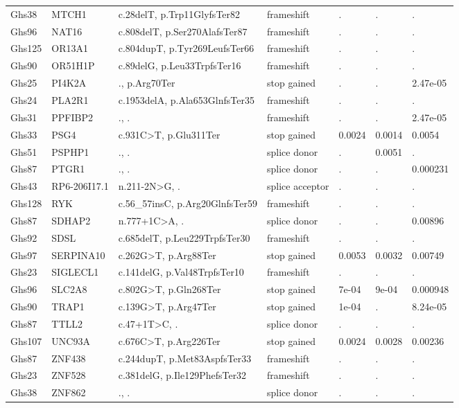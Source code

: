 \documentclass[12pt,twoside]{reedthesis}
\theoremstyle{definition}
\theoremstyle{definition}
\theoremstyle{remark}
\begin{document}
\begin{landscape}
\begin{longtable}[t]{lllllll}
  Ghs38 & MTCH1 & c.28delT, p.Trp11GlyfsTer82 & frameshift & . & . & .\\
  Ghs96 & NAT16 & c.808delT, p.Ser270AlafsTer87 & frameshift & . & . & .\\
  Ghs125 & OR13A1 & c.804dupT, p.Tyr269LeufsTer66 & frameshift & . & . & .\\
  \addlinespace
  Ghs90 & OR51H1P & c.89delG, p.Leu33TrpfsTer16 & frameshift & . & . & .\\
  Ghs25 & PI4K2A & ., p.Arg70Ter & stop gained & . & . & 2.47e-05\\
  Ghs24 & PLA2R1 & c.1953delA, p.Ala653GlnfsTer35 & frameshift & . & . & .\\
  Ghs31 & PPFIBP2 & ., . & frameshift & . & . & 2.47e-05\\
  Ghs33 & PSG4 & c.931C>T, p.Glu311Ter & stop gained & 0.0024 & 0.0014 & 0.0054\\
  \addlinespace
  Ghs51 & PSPHP1 & ., . & splice donor & . & 0.0051 & .\\
  Ghs87 & PTGR1 & ., . & splice donor & . & . & 0.000231\\
  Ghs43 & RP6-206I17.1 & n.211-2N>G, . & splice acceptor & . & . & .\\
  Ghs128 & RYK & c.56\_57insC, p.Arg20GlnfsTer59 & frameshift & . & . & .\\
  Ghs87 & SDHAP2 & n.777+1C>A, . & splice donor & . & . & 0.00896\\
  \addlinespace
  Ghs92 & SDSL & c.685delT, p.Leu229TrpfsTer30 & frameshift & . & . & .\\
  Ghs97 & SERPINA10 & c.262G>T, p.Arg88Ter & stop gained & 0.0053 & 0.0032 & 0.00749\\
  Ghs23 & SIGLECL1 & c.141delG, p.Val48TrpfsTer10 & frameshift & . & . & .\\
  Ghs96 & SLC2A8 & c.802G>T, p.Gln268Ter & stop gained & 7e-04 & 9e-04 & 0.000948\\
  Ghs90 & TRAP1 & c.139G>T, p.Arg47Ter & stop gained & 1e-04 & . & 8.24e-05\\
  \addlinespace
  Ghs87 & TTLL2 & c.47+1T>C, . & splice donor & . & . & .\\
  Ghs107 & UNC93A & c.676C>T, p.Arg226Ter & stop gained & 0.0024 & 0.0028 & 0.00236\\
  Ghs87 & ZNF438 & c.244dupT, p.Met83AspfsTer33 & frameshift & . & . & .\\
  Ghs23 & ZNF528 & c.381delG, p.Ile129PhefsTer32 & frameshift & . & . & .\\
  Ghs38 & ZNF862 & ., . & splice donor & . & . & .\\
  \bottomrule
  \end{longtable}
  \end{landscape}
  
\end{document}
